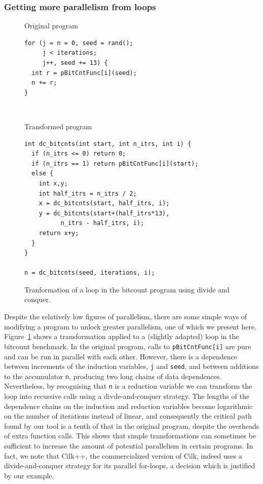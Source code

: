 \subsubsection{Getting more parallelism from loops}

\begin{figure}
  \centering
  \begin{SubFloat}{\label{dnc:orig}Original program}
    \begin{minipage}{3in}
      \begin{verbatim}
for (j = n = 0, seed = rand();
     j < iterations;
     j++, seed += 13) {
  int r = pBitCntFunc[i](seed);
  n += r;
}
      \end{verbatim}
    \end{minipage}%
  \end{SubFloat}%
\\
  \begin{SubFloat}{\label{dnc:trans}Transformed program}
    \begin{minipage}{3in}
      \begin{verbatim}
int dc_bitcnts(int start, int n_itrs, int i) {
  if (n_itrs <= 0) return 0;
  if (n_itrs == 1) return pBitCntFunc[i](start);
  else {
    int x,y;
    int half_itrs = n_itrs / 2;
    x = dc_bitcnts(start, half_itrs, i);
    y = dc_bitcnts(start+(half_itrs*13),
          n_itrs - half_itrs, i);
    return x+y;
  }
}

n = dc_bitcnts(seed, iterations, i);
      \end{verbatim}
    \end{minipage}%
  \end{SubFloat}%
  \caption{Tranformation of a loop in the bitcount program using divide and conquer.}
  \label{dnc}
\end{figure}

Despite the relatively low figures of parallelism, there are some simple ways of modifying a program to unlock greater parallelism, one of which we present here.
Figure~\ref{dnc} shows a transformation applied to a (slightly adapted) loop in the bitcount benchmark.
In the original program, calls to \texttt{pBitCntFunc[i]} are pure and can be run in parallel with each other.
However, there is a dependence between increments of the induction variables, \texttt{j} and \texttt{seed}, and between additions to the accumulator \texttt{n}, producing two long chains of data dependences.
Nevertheless, by recognising that \texttt{n} is a reduction variable we can transform the loop into recursive calls using a divde-and-conquer strategy.
The lengths of the dependence chains on the induction and reduction variables become logarithmic on the number of iterations instead of linear, and consequently the critical path found by our tool is a tenth of that in the original program, despite the overheads of extra function calls.
This shows that simple transformations can sometimes be sufficient to increase the amount of potential parallelism in certain programs.
In fact, we note that Cilk++, the commercialized version of Cilk, indeed uses a divide-and-conquer strategy for its parallel for-loops, a decision which is justified by our example.

